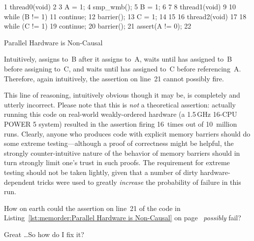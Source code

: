 \begin{listing}[tbp]
{ \scriptsize
\begin{verbbox}
  1 thread0(void)
  2 {
  3   A = 1;
  4   smp_wmb();
  5   B = 1;
  6 }
  7
  8 thread1(void)
  9 {
 10   while (B != 1)
 11     continue;
 12   barrier();
 13   C = 1;
 14 }
 15
 16 thread2(void)
 17 {
 18   while (C != 1)
 19     continue;
 20   barrier();
 21   assert(A != 0);
 22 }
\end{verbbox}
}
\centering
\theverbbox
\caption{Parallel Hardware is Non-Causal}
\label{lst:memorder:Parallel Hardware is Non-Causal}
\end{listing}

Intuitively,  assigns to~B after it assigns to~A,
 waits until  has assigned to~B before
assigning to~C, and  waits until  has
assigned to~C before referencing~A.
Therefore, again intuitively, the assertion on line~21 cannot possibly
fire.

This line of reasoning, intuitively obvious though it may be, is completely
and utterly incorrect.
Please note that this is \emph{not} a theoretical assertion:
actually running this code on real-world weakly-ordered hardware
(a 1.5\,GHz 16-CPU POWER 5 system) resulted in the assertion firing
16~times out of 10~million runs.
Clearly, anyone who produces code with explicit memory barriers
should do some extreme testing---although a proof of correctness might
be helpful, the strongly counter-intuitive nature of the behavior of
memory barriers should in turn strongly limit one's trust in such proofs.
The requirement for extreme testing should not be taken lightly, given
that a number of dirty hardware-dependent tricks were used to
greatly \emph{increase} the probability of failure in this run.

\QuickQuiz{}
	How on earth could the assertion on line~21 of the code in
	Listing~\ref{lst:memorder:Parallel Hardware is Non-Causal} on
	page~\pageref{lst:memorder:Parallel Hardware is Non-Causal}
	\emph{possibly} fail?
 \QuickQuizEnd

\QuickQuiz{}
	Great \ldots So how do I fix it?
 \QuickQuizEnd

